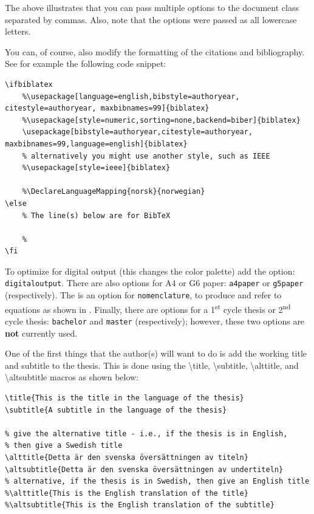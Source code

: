 \documentclass[examplethesis.tex]{subfiles}
\begin{document}
The above illustrates that you can pass multiple options to the document class separated by commas. Also, note that the options were passed as all lowercase letters.

You can, of course, also modify the formatting of the citations and bibliography. See for example the following code snippet:

\begin{lstlisting}[style=latexExampleForAuthors]
\ifbiblatex
    %\usepackage[language=english,bibstyle=authoryear, citestyle=authoryear, maxbibnames=99]{biblatex}
    %\usepackage[style=numeric,sorting=none,backend=biber]{biblatex}
    \usepackage[bibstyle=authoryear,citestyle=authoryear, maxbibnames=99,language=english]{biblatex}
    % alternatively you might use another style, such as IEEE
    %\usepackage[style=ieee]{biblatex}
    
    %\DeclareLanguageMapping{norsk}{norwegian}
\else
    % The line(s) below are for BibTeX
    
    %
\fi
\end{lstlisting}

To optimize for digital output (this changes the color palette) add the option: \texttt{digitaloutput}. There are also options for A4 or G6 paper: \texttt{a4paper} or \texttt{g5paper} (respectively). The is an option for \texttt{nomenclature}, to produce and refer to equations
\ifnomenclature
as shown in 
\fi
.  Finally, there are options for a 1\textsuperscript{st} cycle thesis or 2\textsuperscript{nd} cycle thesis: \texttt{bachelor} and \texttt{master} (respectively); however, these two options are \textbf{not} currently used.

One of the first things that the author(s) will want to do is add the working title and subtitle to the thesis. This is done using the \textbackslash title, \textbackslash subtitle, \textbackslash alttitle, and \textbackslash altsubtitle macros as shown below:
\begin{lstlisting}[style=latexExampleForAuthors]
\title{This is the title in the language of the thesis}
\subtitle{A subtitle in the language of the thesis}

% give the alternative title - i.e., if the thesis is in English,
% then give a Swedish title
\alttitle{Detta är den svenska översättningen av titeln}
\altsubtitle{Detta är den svenska översättningen av undertiteln}
% alternative, if the thesis is in Swedish, then give an English title
%\alttitle{This is the English translation of the title}
%\altsubtitle{This is the English translation of the subtitle}   
\end{lstlisting}
\end{document}
